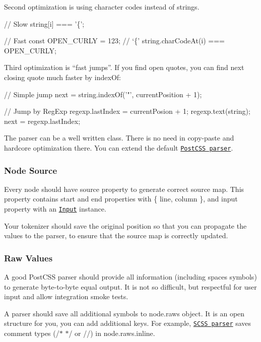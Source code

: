 Second optimization is using character codes instead of strings.


\begin{DoxyCode}
// Slow
string[i] === '\{';

// Fast
const OPEN\_CURLY = 123; // `\{'
string.charCodeAt(i) === OPEN\_CURLY;
\end{DoxyCode}


Third optimization is “fast jumps”. If you find open quotes, you can find next closing quote much faster by {\ttfamily index\+Of}\+:


\begin{DoxyCode}
// Simple jump
next = string.indexOf('"', currentPosition + 1);

// Jump by RegExp
regexp.lastIndex = currentPosion + 1;
regexp.text(string);
next = regexp.lastIndex;
\end{DoxyCode}


The parser can be a well written class. There is no need in copy-\/paste and hardcore optimization there. You can extend the default \href{https://github.com/postcss/postcss/blob/master/lib/parser.es6}{\tt Post\+C\+SS parser}.

\subsubsection*{Node Source}

Every node should have {\ttfamily source} property to generate correct source map. This property contains {\ttfamily start} and {\ttfamily end} properties with {\ttfamily \{ line, column \}}, and {\ttfamily input} property with an \href{https://github.com/postcss/postcss/blob/master/lib/input.es6}{\tt {\ttfamily Input}} instance.

Your tokenizer should save the original position so that you can propagate the values to the parser, to ensure that the source map is correctly updated.

\subsubsection*{Raw Values}

A good Post\+C\+SS parser should provide all information (including spaces symbols) to generate byte-\/to-\/byte equal output. It is not so difficult, but respectful for user input and allow integration smoke tests.

A parser should save all additional symbols to {\ttfamily node.\+raws} object. It is an open structure for you, you can add additional keys. For example, \href{https://github.com/postcss/postcss-scss}{\tt S\+C\+SS parser} saves comment types ({\ttfamily /$\ast$ $\ast$/} or {\ttfamily //}) in {\ttfamily node.\+raws.\+inline}.

